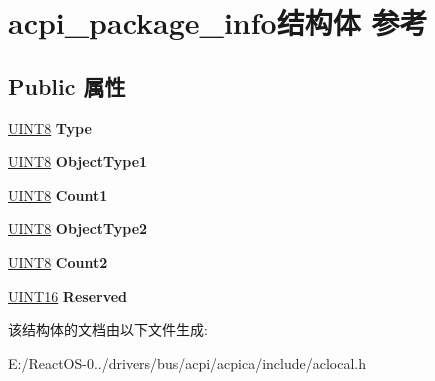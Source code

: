 \hypertarget{structacpi__package__info}{}\section{acpi\+\_\+package\+\_\+info结构体 参考}
\label{structacpi__package__info}
\subsection*{Public 属性}
\begin{DoxyCompactItemize}
\item 
\mbox{\label{structacpi__package__info_a3e31ceeffa40e7783900ab889174e3b4}} 
\hyperlink{_processor_bind_8h_ab27e9918b538ce9d8ca692479b375b6a}{U\+I\+N\+T8} {\bfseries Type}
\item 
\mbox{\label{structacpi__package__info_a26ab7d1c7680c65d6fa2f7afaa7abdd2}} 
\hyperlink{_processor_bind_8h_ab27e9918b538ce9d8ca692479b375b6a}{U\+I\+N\+T8} {\bfseries Object\+Type1}
\item 
\mbox{\label{structacpi__package__info_a9f24e799caedf63e8579908c2602f8da}} 
\hyperlink{_processor_bind_8h_ab27e9918b538ce9d8ca692479b375b6a}{U\+I\+N\+T8} {\bfseries Count1}
\item 
\mbox{\label{structacpi__package__info_a258189860edbbd689589c8ae6806f3a5}} 
\hyperlink{_processor_bind_8h_ab27e9918b538ce9d8ca692479b375b6a}{U\+I\+N\+T8} {\bfseries Object\+Type2}
\item 
\mbox{\label{structacpi__package__info_a72578730c1c0e1872a7d0204a87dfc56}} 
\hyperlink{_processor_bind_8h_ab27e9918b538ce9d8ca692479b375b6a}{U\+I\+N\+T8} {\bfseries Count2}
\item 
\mbox{\label{structacpi__package__info_a26e62b469da8255665654e98aef92983}} 
\hyperlink{_processor_bind_8h_a09f1a1fb2293e33483cc8d44aefb1eb1}{U\+I\+N\+T16} {\bfseries Reserved}
\end{DoxyCompactItemize}


该结构体的文档由以下文件生成\+:\begin{DoxyCompactItemize}
\item 
E\+:/\+React\+O\+S-\/0../drivers/bus/acpi/acpica/include/aclocal.\+h\end{DoxyCompactItemize}
